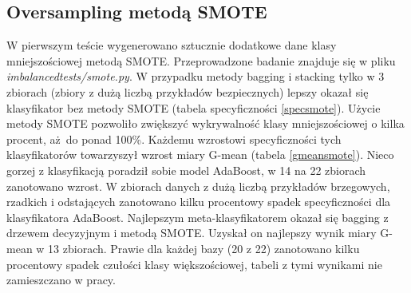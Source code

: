 \subsection{Oversampling metodą SMOTE}
W pierwszym teście wygenerowano sztucznie dodatkowe dane klasy mniejszościowej metodą SMOTE. Przeprowadzone badanie znajduje się w pliku \textit{imbalancedtests/smote.py}. W przypadku metody bagging i stacking tylko w 3 zbiorach (zbiory z dużą liczbą przykładów bezpiecznych) lepszy okazał się klasyfikator bez metody SMOTE (tabela specyficzności \ref{specsmote}). Użycie metody SMOTE pozwoliło zwiększyć wykrywalność klasy mniejszościowej o kilka procent, aż do ponad 100\%. Każdemu wzrostowi specyficzności tych klasyfikatorów towarzyszył wzrost miary G-mean (tabela \ref{gmeansmote}). Nieco gorzej z klasyfikacją poradził sobie model AdaBoost, w 14 na 22 zbiorach zanotowano wzrost. W zbiorach danych z dużą liczbą przykładów brzegowych, rzadkich i odstających zanotowano kilku procentowy spadek specyficzności dla klasyfikatora AdaBoost. Najlepszym meta-klasyfikatorem okazał się bagging z drzewem decyzyjnym i metodą SMOTE. Uzyskał on najlepszy wynik miary G-mean w 13 zbiorach. Prawie dla każdej bazy (20 z 22) zanotowano kilku procentowy spadek czułości klasy większościowej, tabeli z tymi wynikami nie zamieszczano w pracy.
